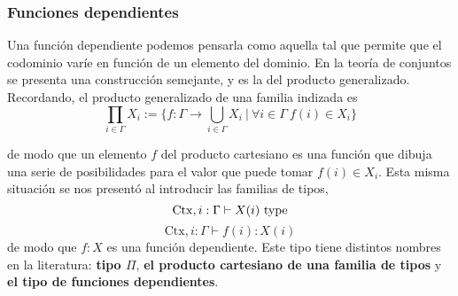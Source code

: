 \documentclass{article}
\begin{document}
    \subsubsection{Funciones dependientes}
        Una función dependiente podemos pensarla como aquella tal que permite
        que el codominio varíe en función de un elemento del dominio. En
        la teoría de conjuntos se presenta una construcción semejante, y es la
        del producto generalizado. Recordando, el producto generalizado de una
        familia indizada es
        $$
            \prod_{i \in \Gamma} X_i := 
            \{f : \Gamma \rightarrow \bigcup\limits_{i \in \Gamma} X_i\ 
                \vert\ \forall i \in \Gamma\ f(i) \in X_i\}
        $$

        de modo que un elemento $f$ del producto cartesiano es una función que
        dibuja una serie de posibilidades para el valor que puede tomar 
        $f(i) \in X_i$. Esta misma situación se nos presentó al introducir las
        familias de tipos,
        $$
            \mathrm{Ctx}, i : \Gamma \vdash X(i)\ \mathrm{type}
        $$
        $$
            \mathrm{Ctx}, i : \Gamma \vdash f(i) : X(i)
        $$
        de modo que $f : X$ es una función dependiente. Este tipo tiene 
        distintos nombres en la literatura: \textbf{tipo $\Pi$}, 
        \textbf{el producto cartesiano de una familia de tipos} y 
        \textbf{el tipo de funciones dependientes}.
\end{document}
